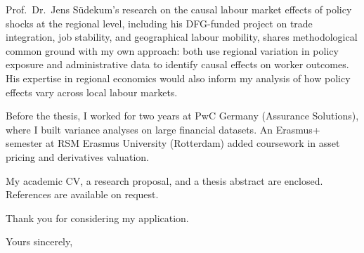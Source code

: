 \documentclass[a4paper,11pt]{letter}
\begin{document}
\begin{letter}
Prof.\ Dr.\ Jens S\"udekum's research on the causal labour market effects of policy shocks at the regional level, including his DFG-funded project on trade integration, job stability, and geographical labour mobility, shares methodological common ground with my own approach: both use regional variation in policy exposure and administrative data to identify causal effects on worker outcomes. His expertise in regional economics would also inform my analysis of how policy effects vary across local labour markets.

Before the thesis, I worked for two years at PwC Germany (Assurance Solutions), where I built variance analyses on large financial datasets. An Erasmus+ semester at RSM Erasmus University (Rotterdam) added coursework in asset pricing and derivatives valuation.

My academic CV, a research proposal, and a thesis abstract are enclosed. References are available on request.

Thank you for considering my application.

\closing{Yours sincerely,}

\end{letter}
\end{document}
